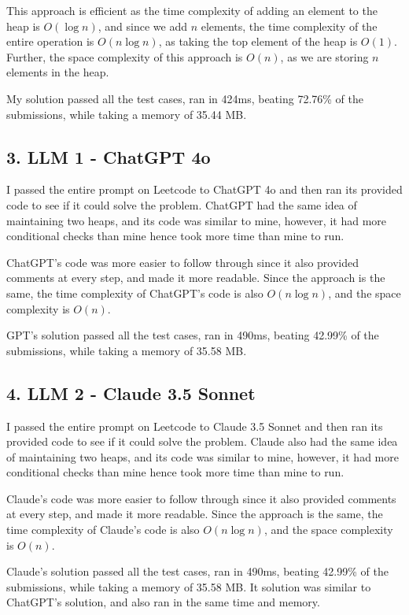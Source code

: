 \documentclass{article}
\theoremstyle{mytheoremstyle}
\theoremstyle{mytheoremstyle}
\theoremstyle{myproblemstyle}
\begin{document}
This approach is efficient as the time complexity of adding an element to the heap is $O(\log n)$, and since we add $n$ elements, the time complexity of the entire operation is $O(n\log n)$, as taking the top element of the heap is $O(1)$. Further, the space complexity of this approach is $O(n)$, as we are storing $n$ elements in the heap. 

My solution passed all the test cases, ran in 424ms, beating 72.76\% of the submissions, while taking a memory of 35.44 MB. 

\subsection*{3. LLM 1 - ChatGPT 4o}
I passed the entire prompt on Leetcode to ChatGPT 4o and then ran its provided code to see if it could solve the problem. ChatGPT had the same idea of maintaining two heaps, and its code was similar to mine, however, it had more conditional checks than mine hence took more time than mine to run. 

ChatGPT's code was more easier to follow through since it also provided comments at every step, and made it more readable. Since the approach is the same, the time complexity of ChatGPT's code is also $O(n\log n)$, and the space complexity is $O(n)$.

GPT's solution passed all the test cases, ran in 490ms, beating 42.99\% of the submissions, while taking a memory of 35.58 MB.

\subsection*{4. LLM 2 - Claude 3.5 Sonnet}
I passed the entire prompt on Leetcode to Claude 3.5 Sonnet and then ran its provided code to see if it could solve the problem. Claude also had the same idea of maintaining two heaps, and its code was similar to mine, however, it had more conditional checks than mine hence took more time than mine to run.

Claude's code was more easier to follow through since it also provided comments at every step, and made it more readable. Since the approach is the same, the time complexity of Claude's code is also $O(n\log n)$, and the space complexity is $O(n)$.

Claude's solution passed all the test cases, ran in 490ms, beating 42.99\% of the submissions, while taking a memory of 35.58 MB. It solution was similar to ChatGPT's solution, and also ran in the same time and memory.
\end{document}

